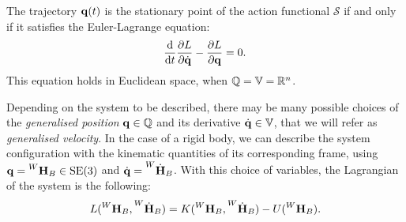 \begin{definition*}
\label{definition:euler_lagrange}
%
The trajectory $\Qu(t)$ is the stationary point of the action functional $\mathcal{S}$ if and only if it satisfies the Euler-Lagrange equation:
\begin{equation*}
    \dv{t} \pdv{L}{\Qud} - \pdv{L}{\Qu} = 0
    .
\end{equation*}
%
This equation holds in Euclidean space, when $\mathbb{Q} = \mathbb{V} = \realn^n$.
%
\end{definition*}

Depending on the system to be described, there may be many possible choices of the \emph{generalised position} $\Qu \in \mathbb{Q}$ and its derivative $\Qud \in \mathbb{V}$, that we will refer as \emph{generalised velocity}.
In the case of a rigid body, we can describe the system configuration with the kinematic quantities of its corresponding frame, \ie using $\Qu = \homo[W]_B \in \SE(3)$ and $\Qud = \homod[W]_B$.
With this choice of variables, the Lagrangian of the system is the following:
%
\begin{equation*}
    L(\homo[W]_B, \homod[W]_B) = K(\homo[W]_B, \homod[W]_B) - U(\homo[W]_B).
\end{equation*}


